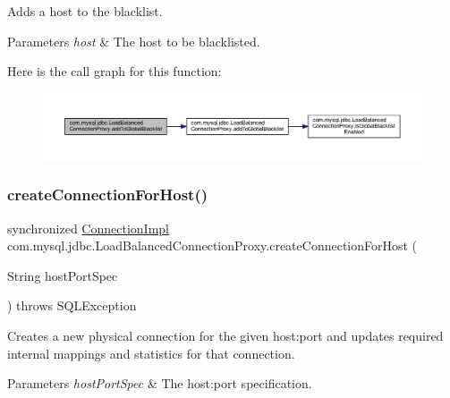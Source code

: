 Adds a host to the blacklist.


\begin{DoxyParams}{Parameters}
{\em host} & The host to be blacklisted. \\
\hline
\end{DoxyParams}
Here is the call graph for this function\+:
\nopagebreak
\begin{figure}[H]
\begin{center}
\leavevmode
\includegraphics[width=350pt]{classcom_1_1mysql_1_1jdbc_1_1_load_balanced_connection_proxy_a9b1718c334191c26cb1befc847cd8aad_cgraph}
\end{center}
\end{figure}
\mbox{\label{classcom_1_1mysql_1_1jdbc_1_1_load_balanced_connection_proxy_a8ab535276152fa3a1aa8621cf3fb1c68}} 
\subsubsection{\texorpdfstring{create\+Connection\+For\+Host()}{createConnectionForHost()}}
{\footnotesize\ttfamily synchronized \mbox{\hyperlink{classcom_1_1mysql_1_1jdbc_1_1_connection_impl}{Connection\+Impl}} com.\+mysql.\+jdbc.\+Load\+Balanced\+Connection\+Proxy.\+create\+Connection\+For\+Host (\begin{DoxyParamCaption}\item[{String}]{host\+Port\+Spec }\end{DoxyParamCaption}) throws S\+Q\+L\+Exception}

Creates a new physical connection for the given host\+:port and updates required internal mappings and statistics for that connection.


\begin{DoxyParams}{Parameters}
{\em host\+Port\+Spec} & The host\+:port specification. \\
\hline
\end{DoxyParams}

